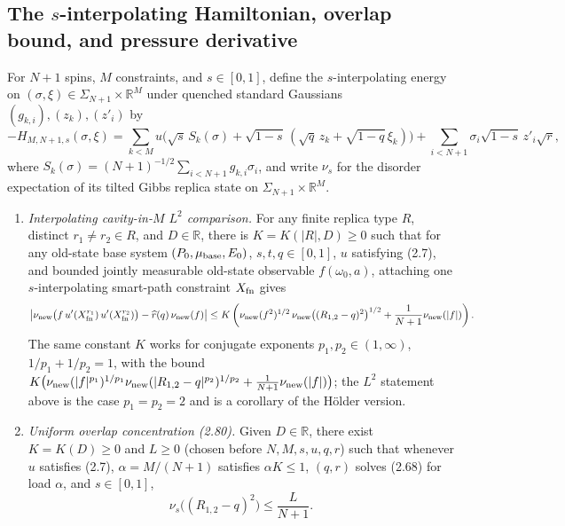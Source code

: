\subsection{The $s$-interpolating Hamiltonian, overlap bound, and pressure derivative}
\label{sub:sg-tal:perceptron-interpolating-hamiltonian}

\begin{lemma}\label{lem:sg-tal:perceptron-interpolating-overlap}
  \leanok
For $N+1$ spins, $M$ constraints, and $s\in[0,1]$, define the $s$-interpolating energy on
$(\sigma,\xi)\in\Sigma_{N+1}\times\mathbb R^M$ under quenched standard Gaussians
$(g_{k,i}),(z_k),(z'_i)$ by
\[
 -H_{M,N+1,s}(\sigma,\xi)
 =\sum_{k<M} u\bigl(\sqrt s\,S_k(\sigma)+\sqrt{1-s}\,(\sqrt q\,z_k+\sqrt{1-q}\,\xi_k)\bigr)
  +\sum_{i<N+1}\sigma_i\sqrt{1-s}\,z'_i\sqrt r,
\]
where $S_k(\sigma)=(N+1)^{-1/2}\sum_{i<N+1}g_{k,i}\sigma_i$, and write $\nu_s$ for the disorder
expectation of its tilted Gibbs replica state on $\Sigma_{N+1}\times\mathbb R^M$.
\begin{enumerate}
\item \emph{Interpolating cavity-in-$M$ $L^2$ comparison.} For any finite replica type $R$, distinct
$r_1\ne r_2\in R$, and $D\in\mathbb R$, there is $K=K(|R|,D)\ge 0$ such that for any old-state base
system $(P_0,\mu_{\rm base},E_0)$, $s,t,q\in[0,1]$, $u$ satisfying (2.7), and bounded jointly
measurable old-state observable $f(\omega_0,a)$, attaching one $s$-interpolating smart-path
constraint $X_{\rm fn}$ gives
\[
 \bigl|\nu_{\rm new}\bigl(f\,u'(X_{\rm fn}^{r_1})\,u'(X_{\rm fn}^{r_2})\bigr)
   -\widehat r(q)\,\nu_{\rm new}(f)\bigr|
 \le K\left(\nu_{\rm new}(f^2)^{1/2}\,\nu_{\rm new}\bigl((R_{1,2}-q)^2\bigr)^{1/2}
   +\frac{1}{N+1}\nu_{\rm new}(|f|)\right).
\]
The same constant $K$ works for conjugate exponents $p_1,p_2\in(1,\infty)$,
$1/p_1+1/p_2=1$, with the bound
$K\bigl(\nu_{\rm new}(|f|^{p_1})^{1/p_1}\nu_{\rm new}(|R_{1,2}-q|^{p_2})^{1/p_2}
+\frac{1}{N+1}\nu_{\rm new}(|f|)\bigr)$; the $L^2$ statement above is the case
$p_1=p_2=2$ and is a corollary of the H\"older version.
\item \emph{Uniform overlap concentration (2.80).} Given $D\in\mathbb R$, there exist $K=K(D)\ge 0$
and $L\ge 0$ (chosen before $N,M,s,u,q,r$) such that whenever $u$ satisfies (2.7),
$\alpha=M/(N+1)$ satisfies $\alpha K\le 1$, $(q,r)$ solves (2.68) for load $\alpha$, and
$s\in[0,1]$,
\[
 \nu_s\bigl((R_{1,2}-q)^2\bigr)\le\frac{L}{N+1}.
\]
\end{enumerate}
\end{lemma}
